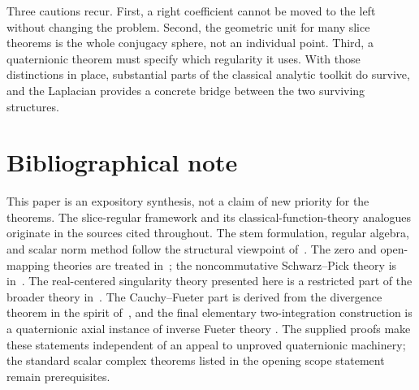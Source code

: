 \documentclass[11pt,a4paper]{article}
\numberwithin{equation}{section}
\theoremstyle{definition}
\theoremstyle{remark}
\begin{document}
Three cautions recur. First, a right coefficient cannot be moved to the
left without changing the problem. Second, the geometric unit for many
slice theorems is the whole conjugacy sphere, not an individual point.
Third, a quaternionic theorem must specify which regularity it uses.
With those distinctions in place, substantial parts of the classical
analytic toolkit do survive, and the Laplacian provides a concrete bridge
between the two surviving structures.

\section*{Bibliographical note}
This paper is an expository synthesis, not a claim of new priority for the
theorems. The slice-regular framework and its classical-function-theory
analogues originate in the sources cited throughout. The stem formulation,
regular algebra, and scalar norm method follow the structural viewpoint
of~\cite{GP}. The zero and open-mapping theories are treated
in~\cite{GStZeros,GStOpen}; the noncommutative Schwarz--Pick theory is
in~\cite{BS}. The real-centered singularity theory presented here is a
restricted part of the broader theory in~\cite{GPStSing}. The
Cauchy--Fueter part is derived from the divergence theorem in the spirit
of~\cite{Sudbery}, and the final elementary two-integration construction
is a quaternionic axial instance of inverse Fueter theory
\cite{CSSInverse,CPSSInverse}. The supplied proofs make these statements
independent of an appeal to unproved quaternionic machinery; the standard
scalar complex theorems listed in the opening scope statement remain
prerequisites.
\end{document}

